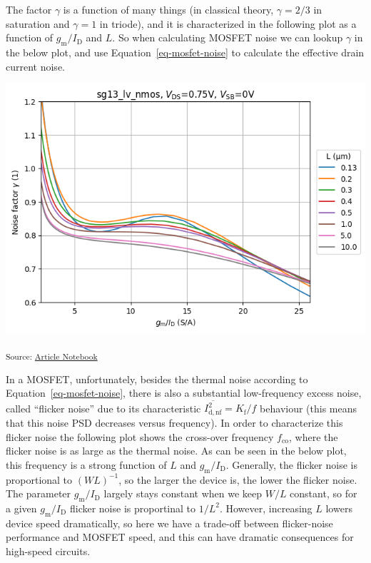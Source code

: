 \documentclass[
  a4paper,
  DIV=11,
  numbers=noendperiod]{scrartcl}
\begin{document}
The factor \(\gamma\) is a function of many things (in classical theory,
\(\gamma = 2/3\) in saturation and \(\gamma = 1\) in triode), and it is
characterized in the following plot as a function of
\(g_\mathrm{m}/I_\mathrm{D}\) and \(L\). So when calculating MOSFET
noise we can lookup \(\gamma\) in the below plot, and use
Equation~\ref{eq-mosfet-noise} to calculate the effective drain current
noise.

\includegraphics{index_files/figure-latex/.-sizing-techsweep_sg13_plots_nmos-cell-13-output-1.png}

\textsubscript{Source:
\href{https://iic-jku.github.io/analog-circuit-design/index.qmd.html}{Article
Notebook}}

In a MOSFET, unfortunately, besides the thermal noise according to
Equation~\ref{eq-mosfet-noise}, there is also a substantial
low-frequency excess noise, called ``flicker noise'' due to its
characteristic \(\overline{I_\mathrm{d,nf}^2} = K_\mathrm{f}/f\)
behaviour (this means that this noise PSD decreases versus frequency).
In order to characterize this flicker noise the following plot shows the
cross-over frequency \(f_\mathrm{co}\), where the flicker noise is as
large as the thermal noise. As can be seen in the below plot, this
frequency is a strong function of \(L\) and
\(g_\mathrm{m}/I_\mathrm{D}\). Generally, the flicker noise is
proportional to \((W L)^{-1}\), so the larger the device is, the lower
the flicker noise. The parameter \(g_\mathrm{m}/I_\mathrm{D}\) largely
stays constant when we keep \(W/L\) constant, so for a given
\(g_\mathrm{m}/I_\mathrm{D}\) flicker noise is proportinal to \(1/L^2\).
However, increasing \(L\) lowers device speed dramatically, so here we
have a trade-off between flicker-noise performance and MOSFET speed, and
this can have dramatic consequences for high-speed circuits.
\end{document}
